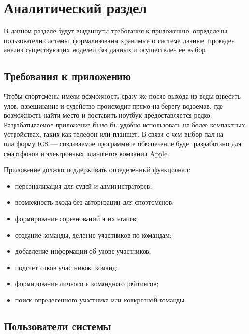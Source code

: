 \section{Аналитический раздел} \label{analysis}

В данном разделе будут выдвинуты требования к приложению, определены пользователи системы, формализованы хранимые о системе данные, проведен анализ существующих моделей баз данных и осуществлен ее выбор.

\subsection{Требования к приложению}

Чтобы спортсмены имели возможность сразу же после выхода из воды взвесить улов, взвешивание и судейство происходит прямо на берегу водоемов, где возможность найти место и поставить ноутбук предоставляется редко. Разрабатываемое приложение было бы удобно использовать на более компактных устройствах, таких как телефон или планшет. В связи с чем выбор пал на платформу iOS --- создаваемое программное обеспечение будет разработано для смартфонов и электронных планшетов компании Apple.

Приложение должно поддерживать определенный функционал:
\begin{itemize}[label=---]
	\item персонализация для судей и администраторов;
	\item возможность входа без авторизации для спортсменов;
	\item формирование соревнований и их этапов;
	\item создание команды, деление участников по командам;
	\item добавление информации об улове участников;
	\item подсчет очков участников, команд;
	\item формирование личного и командного рейтингов;
	\item поиск определенного участника или конкретной команды.
\end{itemize}

\subsection{Пользователи системы}

